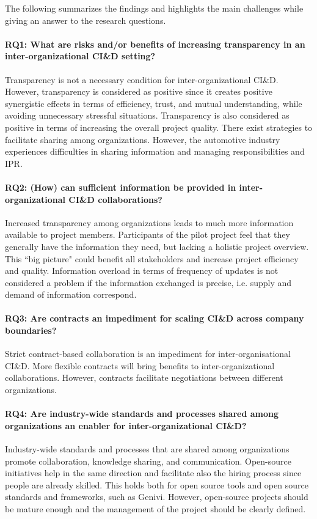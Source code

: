 The following summarizes the findings and highlights the main challenges while giving an answer to the research questions.

\paragraph*{RQ1: What are risks and/or benefits of increasing %
transparency {in an inter-organizational CI\&D setting}?} %
Transparency is not a necessary condition for inter-organizational CI\&D. However, transparency is considered as positive since it creates positive %
{synergistic} effects in terms of efficiency, trust, and mutual understanding, while avoiding unnecessary stressful situations. Transparency is also considered as positive in terms of increasing the overall project quality. 
There exist strategies to facilitate sharing among organizations. However, the automotive industry experiences difficulties in sharing information and managing responsibilities and IPR.
\paragraph*{RQ2: (How) can sufficient information be provided in inter-organizational CI\&D collaborations?} %
Increased transparency among organizations leads to much more information available to project members. 
Participants of the pilot project feel that they generally have the information they need, but lacking a holistic project overview. 
This ``big picture" could benefit all stakeholders and increase project efficiency and quality. 
Information overload in terms of frequency of updates is not considered a problem if the information exchanged is precise, i.e. supply and demand of information correspond.
\paragraph*{RQ3: Are contracts an impediment for scaling %
{CI\&D} across company boundaries?} %
Strict contract-based collaboration is an impediment for inter-organisational CI\&D. More flexible contracts will bring benefits to inter-organizational collaborations. However, contracts facilitate negotiations between different organizations. 
\paragraph*{RQ4: Are industry-wide standards and processes shared among organizations an enabler{ for inter-organizational CI\&D}?} %
Industry-wide standards and processes that are shared among organizations promote collaboration, knowledge sharing, and communication.
Open-source initiatives help in the same direction and facilitate also the hiring process since people are already skilled. 
This holds both for open source tools and open source standards and frameworks, such as Genivi. 
However, open-source projects should be mature enough and the management of the project should be clearly defined.


